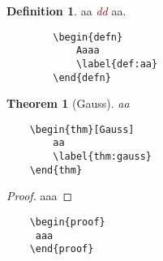 \documentclass[a4paper,10pt,landscape]{article}
\newtheorem{thm}{Theorem}[section]
\theoremstyle{definition}
\newtheorem{defn}{Definition}[section]
\theoremstyle{remark}
\newcommand{\refthm}[1]{Theorem~\ref{#1}}
\newcommand{\hDefined}[1]{\textcolor{darkred}{\textit{#1}}} %
\begin{document}
\begin{multicols}{3}
\begin{multicols}{2}
	\begin{defn}
		aa \hDefined{dd} aa.
		\label{def:aa}
	\end{defn}
\columnbreak
	\begin{verbatim}
		\begin{defn}
			Aaaa
			\label{def:aa}
		\end{defn}
	\end{verbatim}
\end{multicols}

\begin{multicols}{2}
	\begin{thm}[Gauss]
		aa	
		\label{thm:gauss}
	\end{thm}
\columnbreak
	\begin{verbatim}
	\begin{thm}[Gauss]
		aa	
		\label{thm:gauss}
	\end{thm}
	\end{verbatim}
\end{multicols}
\begin{multicols}{2}
	\begin{proof}
		aaa
	\end{proof}
\columnbreak
	\begin{verbatim}
	\begin{proof}
	 aaa
	\end{proof}
	\end{verbatim}
\end{multicols}


\end{multicols}
\end{document}
